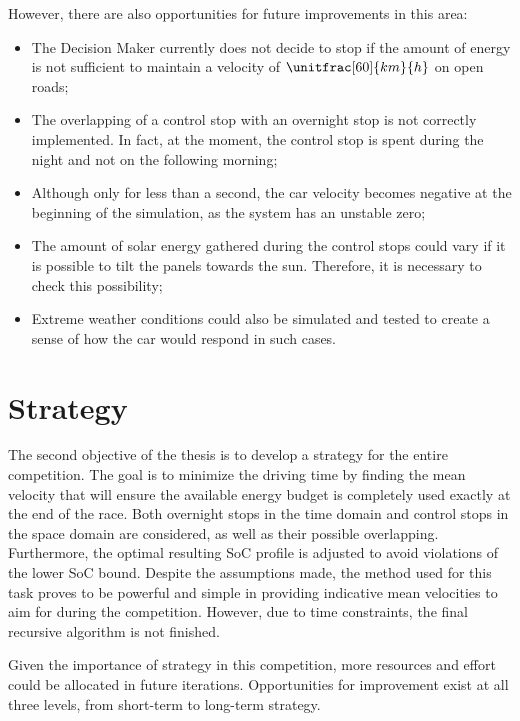 However, there are also opportunities for future improvements in this area:
\begin{itemize}
	\item The Decision Maker currently does not decide to stop if the amount of energy is not sufficient to maintain a velocity of $\unitfrac[60]{km}{h}$ on open roads;
	\item The overlapping of a control stop with an overnight stop is not correctly implemented. In fact, at the moment, the control stop is spent during the night and not on the following morning;
	\item Although only for less than a second, the car velocity becomes negative at the beginning of the simulation, as the system has an unstable zero;
	\item The amount of solar energy gathered during the control stops could vary if it is possible to tilt the panels towards the sun. Therefore, it is necessary to check this possibility;
	\item Extreme weather conditions could also be simulated and tested to create a sense of how the car would respond in such cases.
\end{itemize}


\section{Strategy}
The second objective of the thesis is to develop a strategy for the entire competition. The goal is to minimize the driving time by finding the mean velocity that will ensure the available energy budget is completely used exactly at the end of the race. Both overnight stops in the time domain and control stops in the space domain are considered, as well as their possible overlapping. Furthermore, the optimal resulting SoC profile is adjusted to avoid violations of the lower SoC bound. Despite the assumptions made, the method used for this task proves to be powerful and simple in providing indicative mean velocities to aim for during the competition. However, due to time constraints, the final recursive algorithm is not finished.

Given the importance of strategy in this competition, more resources and effort could be allocated in future iterations. Opportunities for improvement exist at all three levels, from short-term to long-term strategy.

